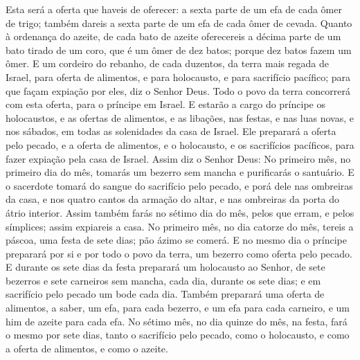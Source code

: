 Esta será a oferta que haveis de oferecer: a sexta parte de um
efa de cada ômer de trigo; também dareis a sexta parte de um efa de
cada ômer de cevada. Quanto à ordenança do azeite, de cada
bato de azeite oferecereis a décima parte de um bato tirado de um
coro, que é um ômer de dez batos; porque dez batos fazem um ômer.
E um cordeiro do rebanho, de cada duzentos, da terra mais
regada de Israel, para oferta de alimentos, e para holocausto, e
para sacrifício pacífico; para que façam expiação por eles, diz o
Senhor Deus. Todo o povo da terra concorrerá com esta oferta,
para o príncipe em Israel. E estarão a cargo do príncipe os
holocaustos, e as ofertas de alimentos, e as libações, nas festas, e
nas luas novas, e nos sábados, em todas as solenidades da casa de
Israel. Ele preparará a oferta pelo pecado, e a oferta de alimentos,
e o holocausto, e os sacrifícios pacíficos, para fazer expiação pela
casa de Israel. Assim diz o Senhor Deus: No primeiro mês, no
primeiro dia do mês, tomarás um bezerro sem mancha e purificarás o
santuário. E o sacerdote tomará do sangue do sacrifício pelo
pecado, e porá dele nas ombreiras da casa, e nos quatro cantos da
armação do altar, e nas ombreiras da porta do átrio interior.
Assim também farás no sétimo dia do mês, pelos que erram, e
pelos símplices; assim expiareis a casa. No primeiro mês, no
dia catorze do mês, tereis a páscoa, uma festa de sete dias; pão
ázimo se comerá. E no mesmo dia o príncipe preparará por si e
por todo o povo da terra, um bezerro como oferta pelo pecado.
E durante os sete dias da festa preparará um holocausto ao
Senhor, de sete bezerros e sete carneiros sem mancha, cada dia,
durante os sete dias; e em sacrifício pelo pecado um bode cada dia.
Também preparará uma oferta de alimentos, a saber, um efa,
para cada bezerro, e um efa para cada carneiro, e um him de azeite
para cada efa. No sétimo mês, no dia quinze do mês, na festa,
fará o mesmo por sete dias, tanto o sacrifício pelo pecado, como o
holocausto, e como a oferta de alimentos, e como o azeite.

\medskip

